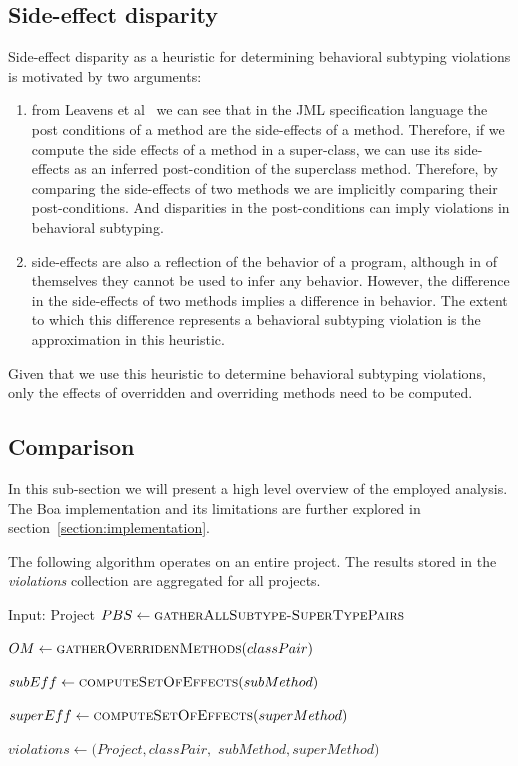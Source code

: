 \documentclass{acm_proc_article-sp}
\begin{document}
\subsection{Side-effect disparity}
Side-effect disparity as a heuristic for determining behavioral subtyping violations is motivated by two arguments:
\begin{enumerate}
\item from Leavens et al~\cite{leavens2006jml, leavens2006design} we can see that in the JML specification language the post conditions of a method are the side-effects of a method. Therefore, if we compute the side effects of a method in a super-class, we can use its side-effects as an inferred post-condition of the superclass method. Therefore, by comparing the side-effects of two methods we are implicitly comparing their post-conditions. And disparities in the post-conditions can imply violations in behavioral subtyping.
\item side-effects are also a reflection of the behavior of a program, although in of themselves they cannot be used to infer any behavior. However, the difference in the side-effects of two methods implies a difference in behavior. The extent to which this difference represents a behavioral subtyping violation is the approximation in this heuristic.
\end{enumerate}

Given that we use this heuristic to determine behavioral subtyping violations, only the effects of overridden and overriding methods need to be computed.

\subsection{Comparison}
In this sub-section we will present a high level overview of the employed analysis.
The Boa implementation and its limitations are further explored in section~\ref{section:implementation}.

The following algorithm operates on an entire project. The results stored in the \emph{violations} collection are aggregated for all projects.
\begin{algorithmic}
\State Input: Project
\State $PBS \gets \Call{gatherAllSubtype-SuperTypePairs}{}$
  
  $OM \gets \Call{gatherOverridenMethods}{classPair}$
  
    \State $subEff \gets \Call{computeSetOfEffects}{subMethod}$

    \State $superEff \gets \Call{computeSetOfEffects}{superMethod}$
    
      \State $violations \gets (Project, classPair,$ 
                     \State $subMethod, superMethod)$
    
    \EndIf
  \EndFor

\EndFor
\end{algorithmic}
\end{document}
